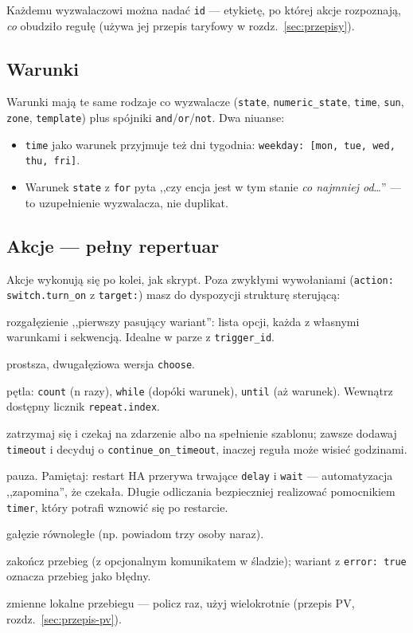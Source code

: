 \documentclass[11pt,a4paper]{article}
\begin{document}
Każdemu wyzwalaczowi można nadać \texttt{id} --- etykietę, po której akcje rozpoznają, \emph{co} obudziło regułę (używa jej przepis taryfowy w rozdz.~\ref{sec:przepisy}).

\subsection{Warunki}

Warunki mają te same rodzaje co wyzwalacze (\texttt{state}, \texttt{numeric\_state}, \texttt{time}, \texttt{sun}, \texttt{zone}, \texttt{template}) plus spójniki \texttt{and}/\texttt{or}/\texttt{not}. Dwa niuanse:

\begin{itemize}
\item \texttt{time} jako warunek przyjmuje też dni tygodnia: \texttt{weekday: [mon, tue, wed, thu, fri]}.
\item Warunek \texttt{state} z \texttt{for} pyta ,,czy encja jest w tym stanie \emph{co najmniej od}\ldots'' --- to uzupełnienie wyzwalacza, nie duplikat.
\end{itemize}

\subsection{Akcje --- pełny repertuar}

Akcje wykonują się po kolei, jak skrypt. Poza zwykłymi wywołaniami (\texttt{action: switch.turn\_on} z \texttt{target:}) masz do dyspozycji strukturę sterującą:

\begin{description}[style=nextline]
\item[choose / default] rozgałęzienie ,,pierwszy pasujący wariant'': lista opcji, każda z własnymi warunkami i sekwencją. Idealne w parze z \texttt{trigger\_id}.
\item[if / then / else] prostsza, dwugałęziowa wersja \texttt{choose}.
\item[repeat] pętla: \texttt{count} (n razy), \texttt{while} (dopóki warunek), \texttt{until} (aż warunek). Wewnątrz dostępny licznik \texttt{repeat.index}.
\item[wait\_for\_trigger / wait\_template] zatrzymaj się i czekaj na zdarzenie albo na spełnienie szablonu; zawsze dodawaj \texttt{timeout} i decyduj o \texttt{continue\_on\_timeout}, inaczej reguła może wisieć godzinami.
\item[delay] pauza. Pamiętaj: restart HA przerywa trwające \texttt{delay} i \texttt{wait} --- automatyzacja ,,zapomina'', że czekała. Długie odliczania bezpieczniej realizować pomocnikiem \texttt{timer}, który potrafi wznowić się po restarcie.
\item[parallel] gałęzie równoległe (np. powiadom trzy osoby naraz).
\item[stop] zakończ przebieg (z opcjonalnym komunikatem w śladzie); wariant z \texttt{error: true} oznacza przebieg jako błędny.
\item[variables] zmienne lokalne przebiegu --- policz raz, użyj wielokrotnie (przepis PV, rozdz.~\ref{sec:przepis-pv}).
\end{description}
\end{document}
